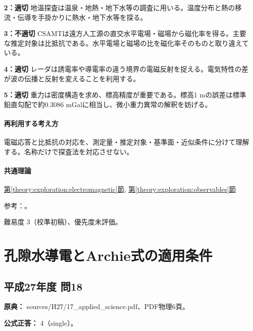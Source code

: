 \noindent\textbf{2：適切} 地温探査は温泉・地熱・地下水等の調査に用いる。温度分布と熱の移流・伝導を手掛かりに熱水・地下水等を探る。\par

\noindent\textbf{3：不適切} CSAMTは遠方人工源の直交水平電場・磁場から磁化率を得る。主要な推定対象は比抵抗である。水平電場と磁場の比を磁化率そのものと取り違えている。\par

\noindent\textbf{4：適切} レーダは誘電率や導電率の違う境界の電磁反射を捉える。電気特性の差が波の伝播と反射を変えることを利用する。\par

\noindent\textbf{5：適切} 重力は密度構造を求め、標高精度が重要である。標高1 mの誤差は標準鉛直勾配で約0.3086 mGalに相当し、微小重力異常の解釈を妨げる。\par

\paragraph{再利用する考え方} 電磁応答と比抵抗の対応を、測定量・推定対象・基準面・近似条件に分けて理解する。名称だけで探査法を対応させない。

\paragraph{共通理論} \hyperref[theory:exploration:electromagnetic]{第\ref*{theory:exploration:electromagnetic}節}, \hyperref[theory:exploration:observables]{第\ref*{theory:exploration:observables}節}

\par 参考：\cite{ochi_csamt_saijo,gsi_gravity_definitions}。

\par 難易度 3（校準初稿）、優先度未評価。

\section{孔隙水導電とArchie式の適用条件}

\subsection{平成27年度 問18}
\label{q:h27-reg-applied-18}

\noindent\textbf{原典：} sources/H27/17\_applied\_science.pdf、PDF物理6頁。

\textbf{公式正答：} 4（single）。


